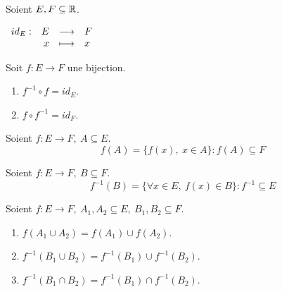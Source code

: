 \begin{definition}
    Soient $E, F \subseteq \mathbb{R}$.
	\begin{center}
		$
		\begin{array}{rrcl} id_E : & E & \longrightarrow & F \\ & x & \longmapsto & x \end{array}
		$
	\end{center}
\end{definition}

\begin{proposition}
	Soit $f : E \to F$ une bijection.
    \begin{multicols}{2}
        \begin{enumerate}
            \item $f^{-1} \circ f = id_E$.
            \item $f \circ f^{-1} = id_F$.
        \end{enumerate}
    \end{multicols}
\end{proposition}

\begin{definition}
    Soient $f : E \to F,\ A \subseteq E$.
	\[ f(A) = \{ f(x),\ x \in A \} : f(A) \subseteq F \]
\end{definition}

\begin{definition}
	Soient $f : E \to F,\ B \subseteq F$.
	\[ f^{-1}(B) = \{ \forall x \in E,\ f(x) \in B \} : f^{-1} \subseteq E \]
\end{definition}

\begin{proposition}
    Soient $f : E \to F,\ A_1, A_2 \subseteq E,\ B_1, B_2 \subseteq F$.
    \begin{enumerate}
        \item $f(A_1 \cup A_2) = f(A_1) \cup f(A_2)$.
        \item $f^{-1} (B_1 \cup B_2) = f^{-1} (B_1) \cup f^{-1} (B_2)$.
        \item $f^{-1} (B_1 \cap B_2) = f^{-1} (B_1) \cap f^{-1} (B_2)$.
    \end{enumerate}
\end{proposition} 

